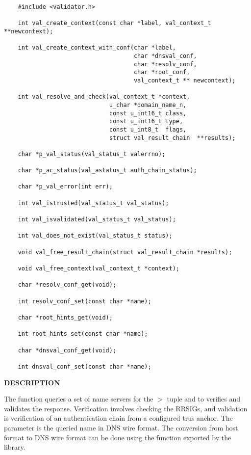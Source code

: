 \begin{verbatim}
    #include <validator.h>

    int val_create_context(const char *label, val_context_t **newcontext);

    int val_create_context_with_conf(char *label,
                                     char *dnsval_conf,
                                     char *resolv_conf,
                                     char *root_conf,
                                     val_context_t ** newcontext);

    int val_resolve_and_check(val_context_t *context,
                              u_char *domain_name_n,
                              const u_int16_t class,
                              const u_int16_t type,
                              const u_int8_t  flags,
                              struct val_result_chain  **results);

    char *p_val_status(val_status_t valerrno);

    char *p_ac_status(val_astatus_t auth_chain_status);

    char *p_val_error(int err);

    int val_istrusted(val_status_t val_status);

    int val_isvalidated(val_status_t val_status);

    int val_does_not_exist(val_status_t status);

    void val_free_result_chain(struct val_result_chain *results);

    void val_free_context(val_context_t *context);

    char *resolv_conf_get(void);

    int resolv_conf_set(const char *name);

    char *root_hints_get(void);

    int root_hints_set(const char *name);

    char *dnsval_conf_get(void);

    int dnsval_conf_set(const char *name);

\end{verbatim}

{\bf DESCRIPTION}

The  function queries a set of name servers
for the $>$ tuple and to verifies and
validates the response.  Verification involves checking the RRSIGs, and
validation is verification of an authentication chain from a configured trus
anchor.  The  parameter is the queried name in DNS wire
format.  The conversion from host format to DNS wire format can be done using
the  function exported by the  library.

